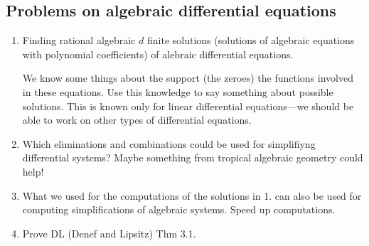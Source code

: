 \documentclass{article}
\theoremstyle{definition}
\begin{document}
\subsection{Problems on algebraic differential equations}
\begin{enumerate}
    \item Finding rational algebraic $d$ finite solutions (solutions of algebraic equations with polynomial coefficients) of alebraic differential equations.\par
    We know some things about the support (the zeroes) the functions involved in these equations. Use this knowledge to say something about possible solutions. This is known only for linear differential equations—we should be able to work on other types of differential equations.
    \item Which eliminations and combinations could be used for simplifiyng differential systems? Maybe something from tropical algebraic geometry could help!\par
    \item What we used for the computations of the solutions in 1. can also be used for computing simplifications of algebraic systems. Speed up computations.
    \item Prove DL (Denef and Lipsitz) Thm 3.1.
\end{enumerate}
\end{document}
